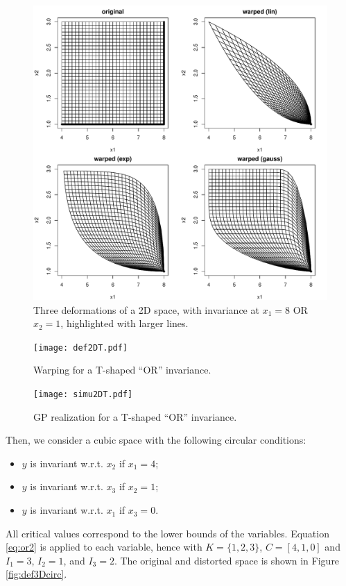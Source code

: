 \documentclass[a4paper,10pt]{article}
\begin{document}
\begin{figure}[!ht]
\centering
 \includegraphics[width=.8\textwidth]{def2DOR.pdf}
 \caption{Three deformations of a 2D space, with invariance at $x_1=8$ OR $x_2=1$, highlighted with larger lines.}\label{fig:def2DOR}
\end{figure}

\begin{figure}[!ht]
 \centering
 \texttt{[image: def2DT.pdf]}
 \caption{Warping for a T-shaped ``OR'' invariance.}\label{fig:def2DT}
\end{figure}

\begin{figure}[!ht]
 \centering
 \texttt{[image: simu2DT.pdf]}
 \caption{GP realization for a T-shaped ``OR'' invariance.}\label{fig:simu2DT}
\end{figure}

Then, we consider a cubic space with the following circular conditions:
\begin{itemize}
 \item $y$ is invariant w.r.t. $x_2$ if $x_1=4$;
 \item $y$ is invariant w.r.t. $x_3$ if $x_2=1$;
 \item $y$ is invariant w.r.t. $x_1$ if $x_3=0$.
\end{itemize}
All critical values correspond to the lower bounds of the variables.
Equation \ref{eq:or2} is applied to each variable, hence with $K=\{1,2,3\}$, $C=[4,1,0]$ and $I_1=3$, $I_2=1$, and $I_3=2$. 
The original and distorted space is shown in Figure \ref{fig:def3Dcirc}.
\end{document}
